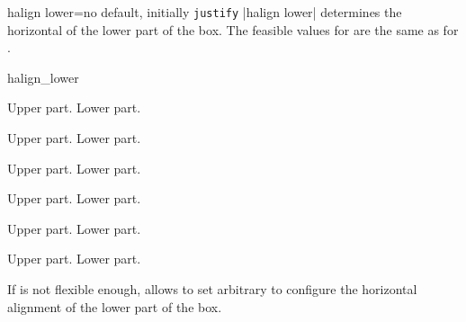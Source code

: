 \clearpage
\begin{docTcbKey}[][doc new=2015-05-07]{halign lower}{=}{no default, initially \texttt{justify}}
  |halign lower| determines the horizontal  of the lower part of the box.
  The feasible values for  are the same as for .

\begin{exdispExample}{halign_lower}
\begin{tcbraster}[raster columns=3,fonttitle=\bfseries,
  colback=red!5!white,colframe=red!75!black]

  \begin{tcolorbox}[adjusted title=flush center,halign lower=flush center]
    Upper part. \tcblower Lower part.
  \end{tcolorbox}
  \begin{tcolorbox}[adjusted title=flush left,halign lower=flush left]
    Upper part. \tcblower Lower part.
  \end{tcolorbox}
  \begin{tcolorbox}[adjusted title=flush right,halign lower=flush right]
    Upper part. \tcblower Lower part.
  \end{tcolorbox}
  \begin{tcolorbox}[adjusted title=center,halign lower=center]
    Upper part. \tcblower Lower part.
  \end{tcolorbox}
  \begin{tcolorbox}[adjusted title=left,halign lower=left]
    Upper part. \tcblower Lower part.
  \end{tcolorbox}
  \begin{tcolorbox}[adjusted title=right,halign lower=right]
    Upper part. \tcblower Lower part.
  \end{tcolorbox}

\end{tcbraster}
\end{exdispExample}
\end{docTcbKey}


\begin{docTcbKeys}[
    doc parameter   = {=\marg{code}},
    doc description = {no default},
    doc new         = 2022-07-07,
    doc name        = halign lower code,
  ]{}
  If  is not flexible enough,
   allows to set
  arbitrary  to configure the horizontal alignment of the lower
  part of the box.
\end{docTcbKeys}


